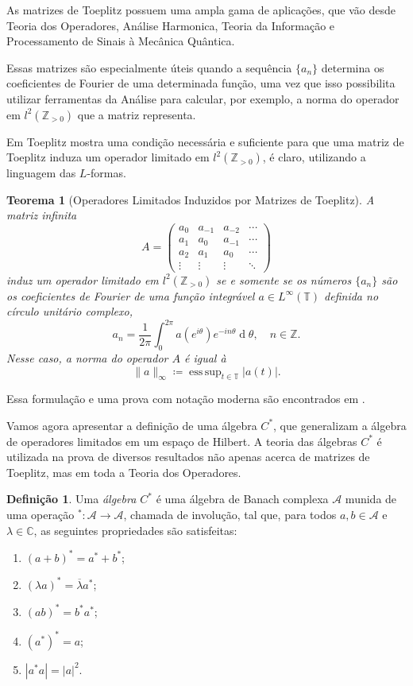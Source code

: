 \documentclass[a4paper,12pt]{article}
\renewcommand{\d}[1]{\ensuremath{\operatorname{d}\!{#1}}}
\DeclareMathOperator*{\esssup}{ess\,sup}
\newtheorem*{theorem*}{Teorema}
\theoremstyle{definition}
\newtheorem*{definition*}{Definição}
\begin{document}
As matrizes de Toeplitz possuem uma ampla gama de aplicações, que vão desde Teoria dos Operadores, Análise Harmonica, Teoria da Informação e Processamento de Sinais à Mecânica Quântica.

Essas matrizes são especialmente úteis quando a sequência $\{a_n\}$ determina os coeficientes de Fourier de uma determinada função, uma vez que isso possibilita utilizar ferramentas da Análise para calcular, por exemplo, a norma do operador em $l^2(\mathbb{Z}_{> 0})$ que a matriz representa.

Em \cite{Toeplitz1911} Toeplitz mostra uma condição necessária e suficiente para que uma matriz de Toeplitz induza um operador limitado em $l^2(\mathbb{Z}_{> 0})$, é claro, utilizando a linguagem das $L$-formas.

\begin{theorem*}[Operadores Limitados Induzidos por Matrizes de Toeplitz]
  A matriz infinita \[A = \begin{pmatrix} a_{0} & a_{-1} & a_{-2} & \cdots \\ a_{1} & a_{0} & a_{-1} & \cdots \\ a_2 & a_{1} & a_{0} & \cdots \\ \vdots & \vdots & \vdots & \ddots \end{pmatrix}\] induz um operador limitado em $l^2(\mathbb{Z}_{>0})$ se e somente se os números $\{a_n\}$ são os coeficientes de Fourier de uma função integrável $a \in L^\infty(\mathbb{T})$ definida no círculo unitário complexo, \[a_n = \frac{1}{2\pi} \int_{0}^{2\pi} a(e^{i \theta})e^{-i n \theta} \d{\theta}, \quad n \in \mathbb{Z}\text{.}\]
  Nesse caso, a norma do operador $A$ é igual à \[\|a\|_{\infty} \coloneqq \esssup_{t \in \mathbb{T}}\lvert a(t)\rvert\text{.}\]
\end{theorem*}

Essa formulação e uma prova com notação moderna são encontrados em \cite{bottcher}.

Vamos agora apresentar a definição de uma álgebra $C^\ast$, que generalizam a álgebra de operadores limitados em um espaço de Hilbert. A teoria das álgebras $C^\ast$ é utilizada na prova de diversos resultados não apenas acerca de matrizes de Toeplitz, mas em toda a Teoria dos Operadores.

\begin{definition*} Uma \textit{álgebra $C^\ast$} é uma álgebra de Banach complexa $\mathcal{A}$ munida de uma operação $^\ast : \mathcal{A} \to \mathcal{A}$, chamada de involução, tal que, para todos $a, b \in \mathcal{A}$ e $\lambda \in \mathbb{C}$, as seguintes propriedades são satisfeitas:
  \begin{enumerate} \item $(a + b)^\ast = a^\ast + b^\ast$; \item $(\lambda a)^\ast = \overline{\lambda} a^\ast$; \item $(ab)^\ast = b^\ast a^\ast$; \item $(a^\ast)^\ast = a$; \item $|a^\ast a| = |a|^2$.
  \end{enumerate}
\end{definition*}
\end{document}
